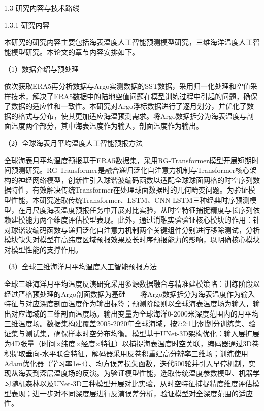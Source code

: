 \documentclass[
  12pt,
]{article}
\begin{document}
\protect{}\label{_Toc261626932}{}1.3 研究内容与技术路线

\protect{}\label{_Toc1264820715}{}1.3.1 研究内容

本研究的研究内容主要包括海表温度人工智能预测模型研究，三维海洋温度人工智能模型研究。本论文的章节内容安排如下。

（1）数据介绍与预处理

依次获取ERA5再分析数据与Argo实测数据的SST数据，采用归一化处理和空值采样技术，解决了ERA5数据中的陆地空值问题在模型训练过程中引起的问题，确保了数据的适应性和一致性。本研究对Argo浮标数据进行了逐月划分，并优化了数据的格式与分布，使其更加适应海温预测需求。将Argo数据拆分为海表温度与剖面温度两个部分，其中海表温度作为输入，剖面温度作为输出。

（2）全球海表月平均温度人工智能预报方法

全球海表月平均温度预报基于ERA5数据集，采用RG-Transformer模型开展短期时间预测研究。RG-Transformer是融合递归泛化自注意力机制与Transformer核心架构的神经网络模型，创新性引入球谐波编码函数以适配全球球面网格的时空序列数据特性，有效解决传统Transformer在处理球面数据时的几何畸变问题。为验证模型性能，本研究选取传统Transformer、LSTM、CNN-LSTM三种经典时序预测模型，在月尺度海表温度预报任务中开展对比实验，从时空特征捕捉精度与长序列依赖建模能力两个维度评估模型表现。此外，通过消融实验验证核心模块的作用：针对球谐波编码函数与递归泛化自注意力机制两个关键组件分别进行移除测试，分析模块缺失对模型在高纬度区域预报效果及长时序预报能力的影响，以明确核心模块对模型性能的支撑作用。

（3）全球三维海洋月平均温度人工智能预报方法

\protect{}\label{_Toc2048618999}{}全球三维海洋月平均温度反演研究采用多源数据融合与精准建模策略：训练阶段以经过严格预处理的Argo剖面数据为基础------将Argo数据拆分为海表温度作为输入特征与对应深度剖面温度作为输出标签；预测阶段则以全球海表温度场为输入，输出对应海域的三维剖面温度场。输出变量为全球海洋0-2000米深度范围内的月平均三维温度场。数据集构建覆盖2005-2020年全球海域，按7:2:1比例划分训练集、验证集与测试集，确保样本时空分布均衡。模型基于UNet-3D架构优化：输入层扩展为4D张量（时间×纬度×经度×特征）以捕捉海表温度时空关联，编码器通过3D卷积提取垂向-水平联合特征，解码器采用反卷积重建高分辨率三维场；训练使用Adam优化器（学习率1e-4）、均方误差损失函数，迭代500轮并引入早停机制，实现从海表到深层温度场的反演。为验证模型性能，选取传统温度参数模型、机器学习随机森林以及UNet-3D三种模型开展对比实验，从时空特征捕捉精度维度评估模型表现；进一步对不同深度层进行反演误差分析，验证模型对全深度范围的适应性。
\end{document}
